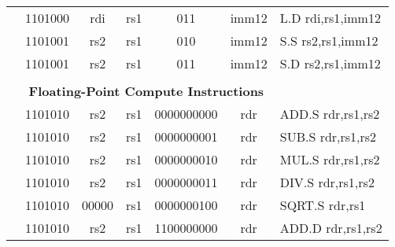 \begin{table}[p]
\begin{small}
\begin{center}
\begin{tabular}{rcccccccccl}
&
\multicolumn{2}{|c|}{1101000} &
\multicolumn{1}{c|}{rdi} &
\multicolumn{1}{c|}{rs1} &
\multicolumn{1}{c|}{011} &
\multicolumn{4}{c|}{imm12} & L.D rdi,rs1,imm12 \\
\cline{2-10}
  

&
\multicolumn{2}{|c|}{1101001} &
\multicolumn{1}{c|}{rs2} &
\multicolumn{1}{c|}{rs1} &
\multicolumn{1}{c|}{010} &
\multicolumn{4}{c|}{imm12} & S.S rs2,rs1,imm12 \\
\cline{2-10}
  

&
\multicolumn{2}{|c|}{1101001} &
\multicolumn{1}{c|}{rs2} &
\multicolumn{1}{c|}{rs1} &
\multicolumn{1}{c|}{011} &
\multicolumn{4}{c|}{imm12} & S.D rs2,rs1,imm12 \\
\cline{2-10}
  

&
\multicolumn{9}{c}{} & \\
&
\multicolumn{9}{c}{\bf Floating-Point Compute Instructions} & \\
\cline{2-10}
  

&
\multicolumn{2}{|c|}{1101010} &
\multicolumn{1}{c|}{rs2} &
\multicolumn{1}{c|}{rs1} &
\multicolumn{4}{c|}{0000000000} &
\multicolumn{1}{c|}{rdr} & ADD.S rdr,rs1,rs2 \\
\cline{2-10}
  

&
\multicolumn{2}{|c|}{1101010} &
\multicolumn{1}{c|}{rs2} &
\multicolumn{1}{c|}{rs1} &
\multicolumn{4}{c|}{0000000001} &
\multicolumn{1}{c|}{rdr} & SUB.S rdr,rs1,rs2 \\
\cline{2-10}
  

&
\multicolumn{2}{|c|}{1101010} &
\multicolumn{1}{c|}{rs2} &
\multicolumn{1}{c|}{rs1} &
\multicolumn{4}{c|}{0000000010} &
\multicolumn{1}{c|}{rdr} & MUL.S rdr,rs1,rs2 \\
\cline{2-10}
  

&
\multicolumn{2}{|c|}{1101010} &
\multicolumn{1}{c|}{rs2} &
\multicolumn{1}{c|}{rs1} &
\multicolumn{4}{c|}{0000000011} &
\multicolumn{1}{c|}{rdr} & DIV.S rdr,rs1,rs2 \\
\cline{2-10}
  

&
\multicolumn{2}{|c|}{1101010} &
\multicolumn{1}{c|}{00000} &
\multicolumn{1}{c|}{rs1} &
\multicolumn{4}{c|}{0000000100} &
\multicolumn{1}{c|}{rdr} & SQRT.S rdr,rs1 \\
\cline{2-10}
  

&
\multicolumn{2}{|c|}{1101010} &
\multicolumn{1}{c|}{rs2} &
\multicolumn{1}{c|}{rs1} &
\multicolumn{4}{c|}{1100000000} &
\multicolumn{1}{c|}{rdr} & ADD.D rdr,rs1,rs2 \\
\cline{2-10}
  


\end{tabular}
\end{center}
\end{small}
\end{table}
